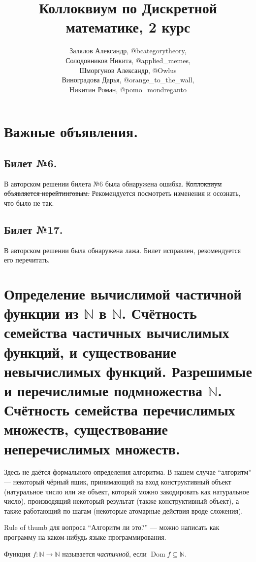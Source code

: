 \documentclass{article}
\title{Коллоквиум по Дискретной математике, 2 курс}
\author{Залялов Александр, @bcategorytheory,\\  Солодовников Никита, @applied\_memes, \\ Шморгунов Александр, @Owlus \\
Виноградова Дарья, @orange\_to\_the\_wall, \\ Никитин Роман, @pomo\_mondreganto}
\date{}
\begin{document}
    \maketitle

    \section*{Важные объявления.}
    \subsection*{Билет №6.} В авторском решении билета №6 была обнаружена ошибка. \sout{Коллоквиум
    объявляется нерейтинговым.} Рекомендуется посмотреть изменения и осознать, что было не так.
    
    \subsection*{Билет №17.} В авторском решении была обнаружена лажа. Билет исправлен, рекомендуется его перечитать.

    \tableofcontents

    \clearpage

    \section{Определение вычислимой частичной функции из $\mathbb{N}$ в $\mathbb{N}$.
    Счётность семейства частичных вычислимых функций, и существование невычислимых функций.
    Разрешимые и перечислимые подмножества $\mathbb{N}$. Счётность семейства перечислимых множеств,
    существование неперечислимых множеств.}

    Здесь не даётся формального определения алгоритма. В нашем случае ``алгоритм'' --- некоторый
    чёрный ящик, принимающий на вход конструктивный объект (натуральное число или же объект, который
    можно закодировать как натуральное число), производящий некоторый результат (также конструктивный
    объект), а также работающий по шагам (некоторые атомарные действия вроде сложения).

    Rule of thumb для вопроса ``Алгоритм ли это?'' --- можно написать как программу на каком-нибудь
    языке программирования.

    \begin{definition}
        Функция $f: \mathbb{N} \to \mathbb{N}$ называется \textit{частичной}, если $\operatorname{Dom} f \subseteq \mathbb{N}$.
    \end{definition}
\end{document}

